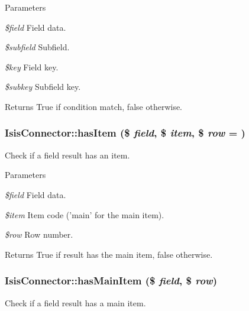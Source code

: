 \begin{DoxyParams}{Parameters}
\item[{\em \$field}]Field data.\item[{\em \$subfield}]Subfield.\item[{\em \$key}]Field key.\item[{\em \$subkey}]Subfield key.\end{DoxyParams}
\begin{DoxyReturn}{Returns}
True if condition match, false otherwise. 
\end{DoxyReturn}
\hypertarget{classIsisConnector_ad88ed9012aac0687aef1c8554879cd52}{
\subsubsection[{hasItem}]{\setlength{\rightskip}{0pt plus 5cm}IsisConnector::hasItem (\$ {\em field}, \/  \$ {\em item}, \/  \$ {\em row} = {})}}
\label{classIsisConnector_ad88ed9012aac0687aef1c8554879cd52}
Check if a field result has an item.


\begin{DoxyParams}{Parameters}
\item[{\em \$field}]Field data.\item[{\em \$item}]Item code ('main' for the main item).\item[{\em \$row}]Row number.\end{DoxyParams}
\begin{DoxyReturn}{Returns}
True if result has the main item, false otherwise. 
\end{DoxyReturn}
\hypertarget{classIsisConnector_a7bc914f2aa6c523404f368dc0b7b130b}{
\subsubsection[{hasMainItem}]{\setlength{\rightskip}{0pt plus 5cm}IsisConnector::hasMainItem (\$ {\em field}, \/  \$ {\em row})}}
\label{classIsisConnector_a7bc914f2aa6c523404f368dc0b7b130b}
Check if a field result has a main item.



